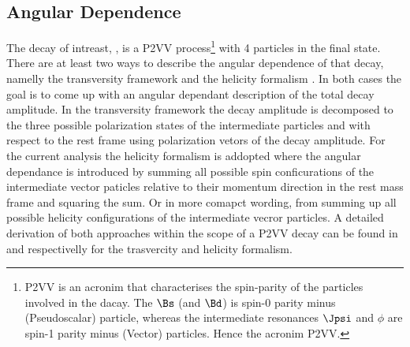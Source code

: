 \subsection{Angular Dependence}
\label{Diferential_Decay_Rate}
The decay of intreast, \BJpsiKst, is a P2VV process\footnote{P2VV is an acronim that characterises the spin-parity of the particles involved in the dacay.
The $\Bs$ (and $\Bd$) is spin-0 parity minus (Pseudoscalar) particle, whereas the intermediate resonances $\Jpsi$ and $\phi$ are spin-1 parity minus (Vector) particles. Hence the
acronim P2VV.} with 4 particles in the final state. There are at least two ways to describe the angular dependence of that decay, namelly the transversity framework \cite{transvFrameworkI,transvFrameworkII}
and the helicity formalism \cite{helicityFormI,helicityFormII}. In both cases the goal is to come up with an angular dependant description of the total decay amplitude.
In the transversity framework the decay amplitude is decomposed to the three possible polarization states of the intermediate particles \Jpsi and \Kst with respect to 
the \Bs rest frame using polarization vetors of the decay amplitude. For the current analysis the helicity formalism is addopted where the angular dependance is 
introduced by summing all possible spin conficurations of the intermediate vector paticles relative to their momentum direction in the \Bs rest mass frame
and squaring the sum. Or in more comapct wording, from summing up all possible helicity configurations of the intermediate vecror particles. A detailed derivation of both 
approaches within the scope of a P2VV decay can be found in \cite{daanThesis} and \cite{jeroenThesis} respectivelly for the trasvercity and helicity formalism.

